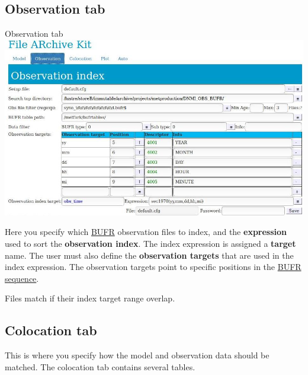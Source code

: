 \documentclass[letterpaper,10pt,twoside,twocolumn,openany]{book}
\begin{document}
\subsection{Observation tab}
\begin{paperbox}{Observation tab}
  \includegraphics[width=\columnwidth]{fark_obs.jpg}
\end{paperbox}
Here you specify which \hyperlink{bufr}{BUFR} observation files to index, and 
the {\bf expression} used to sort the {\bf observation index}.
The index expression is assigned a {\bf target} name. The user must also define the {\bf observation targets} that are used in the index expression. The observation targets point to specific positions in the \hyperlink{sequence}{BUFR sequence}.
\begin{quotebox}
Files match if their index target range overlap.
\end{quotebox}

\subsection{Colocation tab}
This is where you specify how the model and 
observation data should be matched.
The colocation tab contains several tables.
\end{document}
